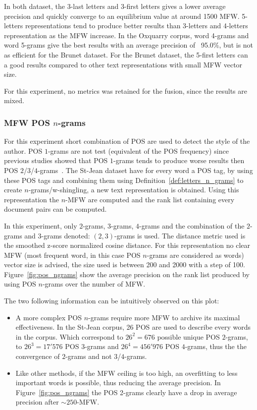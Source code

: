 In both dataset, the 3-last letters and 3-first letters gives a lower average precision and quickly converge to an equilibrium value at around 1500 MFW.
5-letters representations tend to produce better results than 3-letters and 4-letters representation as the MFW increase.
In the Oxquarry corpus, word 4-grams and word 5-grams give the best results with an average precision of ~95.0\%, but is not as efficient for the Brunet dataset.
For the Brunet dataset, the 5-first letters can a good results compared to other text representations with small MFW vector size.

For this experiment, no metrics was retained for the fusion, since the results are mixed.

\subsubsection{MFW POS $n$-grams}

For this experiment short combination of POS are used to detect the style of the author.
POS $1$-grams are not test (equivalent of the POS frequency) since previous studies showed that POS $1$-grams tends to produce worse results then POS $2$/$3$/$4$-grams~\cite{kocher_linking}.
The St-Jean dataset have for every word a POS tag, by using these POS tags and combining them using Definition~\ref{def:letters_n_grams} to create $n$-grams/w-shingling, a new text representation is obtained.
Using this representation the $n$-MFW are computed and the rank list containing every document pairs can be computed.

In this experiment, only $2$-grams, $3$-grams, $4$-grams and the combination of the $2$-grams and $3$-grams denoted: $(2, 3)$-grams is used.
The distance metric used is the smoothed z-score normalized cosine distance.
For this representation no clear MFW (most frequent word, in this case POS $n$-grams are considered as words) vector size is advised, the size used is between 200 and 2000 with a step of 100.
Figure~\ref{fig:pos_ngrams} show the average precision on the rank list produced by using POS $n$-grams over the number of MFW.

The two following information can be intuitively observed on this plot:
\begin{itemize}
  \item
  A more complex POS $n$-grams require more MFW to archive its maximal effectiveness.
  In the St-Jean corpus, 26 POS are used to describe every words in the corpus.
  Which correspond to $26^2 = 676$ possible unique POS $2$-grams, to $26^3 = 17'576$ POS $3$-grams and $26^4 = 456'976$ POS $4$-grams, thus the the convergence of $2$-grams and not $3$/$4$-grams.
  \item
  Like other methods, if the MFW ceiling is too high, an overfitting to less important words is possible, thus reducing the average precision.
  In Figure~\ref{fig:pos_ngrams} the POS 2-grams clearly have a drop in average precision after $\sim 250$-MFW.
\end{itemize}

